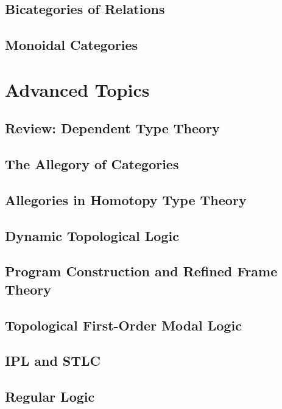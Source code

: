 \documentclass[11pt]{book}
\begin{document}
\section{Bicategories of Relations}

\section{Monoidal Categories}

\chapter{Advanced Topics}

\section*{Review: Dependent Type Theory}

\section{The Allegory of Categories}

\section{Allegories in Homotopy Type Theory}

\section{Dynamic Topological Logic}

\section{Program Construction and Refined Frame Theory}

\section{Topological First-Order Modal Logic}

\section{IPL and STLC}

\section{Regular Logic}
\end{document}
